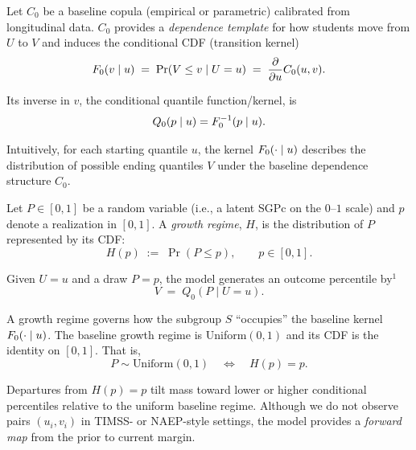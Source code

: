 \documentclass[10pt]{article}
\begin{document}
\noindent
\begin{minipage}[t]{3.75in}
  \vspace{0.05in}
  \hspace{0.15in}%
  \begin{minipage}{3.45in}
    \small\raggedright\color{bodyGrey}

    Let $C_0$ be a baseline copula (empirical or parametric) calibrated from longitudinal data.
    $C_0$ provides a \emph{dependence template} for how students move 
    from $U$ to $V$ and induces the conditional CDF (transition kernel)
    \[
      F_0(v\mid u)\;=\;\Pr(V\le v\mid U=u)\;=\;\frac{\partial}{\partial u}C_0(u,v).
    \]

    \vspace{1pt}
    Its inverse in $v$, the conditional quantile function/kernel, is
    \[
      Q_0(p\mid u)=F_0^{-1}(p\mid u).
    \]

    \vspace{1pt}
    Intuitively, for each starting quantile $u$, the kernel $F_0(\cdot\mid u)$ 
    describes the distribution of possible ending quantiles $V$ under the baseline 
    dependence structure $C_0$.

    \vspace{4pt}
    Let $P\in[0,1]$ be a random variable (i.e., a latent SGPc on the $0$--$1$ scale) 
    and $p$ denote a realization in $[0,1]$. A \emph{growth regime}, $H$, is the 
    distribution of $P$ represented by its CDF:
    \[
      H(p)\;:=\;\Pr(P\le p),\qquad p\in[0,1].
    \]

    \vspace{1pt}
    Given $U=u$ and a draw $P=p$, the model generates an outcome percentile by$^\mbox{1}$
    \[
      V \;=\; Q_0(P\mid U=u).
    \]

    \vspace{1pt}
    A growth regime governs how the subgroup $S$ ``occupies'' the baseline 
    kernel $F_0(\cdot\mid u)$. The baseline growth regime
    is Uniform$(0,1)$ and its CDF is the identity on $[0,1]$. That is, 
    \[
      P \sim \mbox{Uniform}(0,1) \quad \Longleftrightarrow \quad H(p)=p.
    \]

    \vspace{1pt}
    Departures from $H(p)=p$ tilt mass toward lower or higher conditional 
    percentiles relative to the uniform baseline regime. Although we 
    do not observe pairs $(u_i,v_i)$ in TIMSS- or NAEP-style settings, 
    the model provides a \emph{forward map} from the prior to current margin.


\end{minipage}
\end{minipage}
\end{document}

